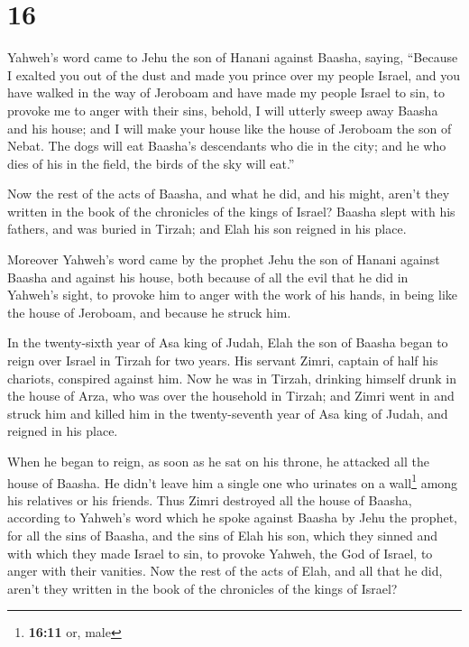 \hypertarget{section-15}{%
\section{16}\label{section-15}}

 Yahweh's word came to Jehu the son of Hanani against
Baasha, saying,  ``Because I exalted you out of the dust
and made you prince over my people Israel, and you have walked in the
way of Jeroboam and have made my people Israel to sin, to provoke me to
anger with their sins,  behold, I will utterly sweep away
Baasha and his house; and I will make your house like the house of
Jeroboam the son of Nebat.  The dogs will eat Baasha's
descendants who die in the city; and he who dies of his in the field,
the birds of the sky will eat.''

 Now the rest of the acts of Baasha, and what he did, and
his might, aren't they written in the book of the chronicles of the
kings of Israel?  Baasha slept with his fathers, and was
buried in Tirzah; and Elah his son reigned in his place.

 Moreover Yahweh's word came by the prophet Jehu the son
of Hanani against Baasha and against his house, both because of all the
evil that he did in Yahweh's sight, to provoke him to anger with the
work of his hands, in being like the house of Jeroboam, and because he
struck him.

 In the twenty-sixth year of Asa king of Judah, Elah the
son of Baasha began to reign over Israel in Tirzah for two years.
 His servant Zimri, captain of half his chariots,
conspired against him. Now he was in Tirzah, drinking himself drunk in
the house of Arza, who was over the household in Tirzah; 
and Zimri went in and struck him and killed him in the twenty-seventh
year of Asa king of Judah, and reigned in his place.

 When he began to reign, as soon as he sat on his throne,
he attacked all the house of Baasha. He didn't leave him a single one
who urinates on a wall\footnote{\textbf{16:11} or, male} among his
relatives or his friends.  Thus Zimri destroyed all the
house of Baasha, according to Yahweh's word which he spoke against
Baasha by Jehu the prophet,  for all the sins of Baasha,
and the sins of Elah his son, which they sinned and with which they made
Israel to sin, to provoke Yahweh, the God of Israel, to anger with their
vanities.  Now the rest of the acts of Elah, and all that
he did, aren't they written in the book of the chronicles of the kings
of Israel?


